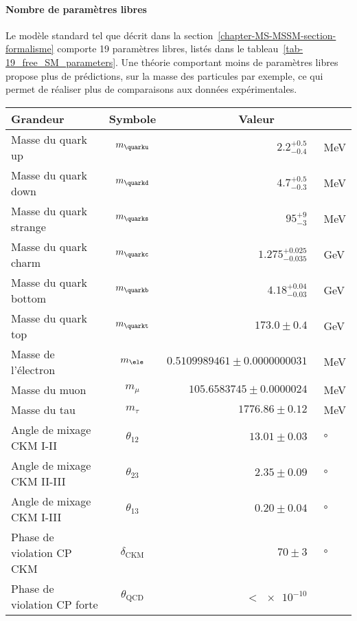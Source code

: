 \paragraph{Nombre de paramètres libres}
Le modèle standard tel que décrit dans la section~\ref{chapter-MS-MSSM-section-formalisme} comporte 19 paramètres libres, listés dans le tableau~\ref{tab-19_free_SM_parameters}.
Une théorie comportant moins de paramètres libres propose plus de prédictions, sur la masse des particules par exemple, ce qui permet de réaliser plus de comparaisons aux données expérimentales.
\begin{table}[h]
\centering
\begin{tabular}{lcrl}
\toprule
Grandeur & Symbole & \multicolumn{2}{c}{Valeur} \\
\midrule
Masse du quark up & $m_{\quarku}$ & $\num{2.2}^{+\num{0.5}}_{-\num{0.4}}$ & \SI{}{\MeV} \\
Masse du quark down & $m_{\quarkd}$ & $\num{4.7}^{+\num{0.5}}_{-\num{0.3}}$ & \SI{}{\MeV} \\
Masse du quark strange & $m_{\quarks}$ & $\num{95}^{+\num{9}}_{-\num{3}}$ & \SI{}{\MeV} \\
Masse du quark charm & $m_{\quarkc}$ & $\num{1.275}^{+\num{0.025}}_{-\num{0.035}}$ & \SI{}{\GeV} \\
Masse du quark bottom & $m_{\quarkb}$ & $\num{4.18}^{+\num{0.04}}_{-\num{0.03}}$ & \SI{}{\GeV} \\
Masse du quark top & $m_{\quarkt}$ & $\num{173.0}\pm\num{0.4}$ & \SI{}{\GeV} \\
Masse de l'électron & $m_{\ele}$ & $\num{0.5109989461}\pm\num{0.0000000031}$ & \SI{}{\MeV} \\
Masse du muon & $m_{\mu}$ & $\num{105.6583745}\pm\num{0.0000024}$ & \SI{}{\MeV} \\
Masse du tau & $m_{\tau}$ & $\num{1776.86}\pm\num{0.12}$ & \SI{}{\MeV} \\
Angle de mixage CKM I-II & $\theta_{12}$ & $\num{13.01}\pm\num{0.03}$ & \SI{}{\degree} \\
Angle de mixage CKM II-III & $\theta_{23}$ & $\num{2.35}\pm\num{0.09}$ & \SI{}{\degree} \\
Angle de mixage CKM I-III & $\theta_{13}$ & $\num{0.20}\pm\num{0.04}$ & \SI{}{\degree} \\
Phase de violation CP CKM & $\delta_{\text{CKM}}$ & $\num{70}\pm\num{3}$ & \SI{}{\degree} \\
Phase de violation CP forte & $\theta_{\text{QCD}}$ & $<\num{e-10}$ & \\

\end{tabular}
\end{table}

